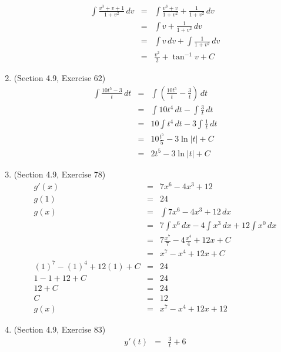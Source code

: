 \documentclass{article}
\begin{document}
\begin{enumerate}
\begin{eqnarray}
            \int{\frac{v^3 + v + 1}{1 + v^2}}\,dv &=& \int{\frac{v^3 + v}{1 + v^2} + \frac{1}{1 + v^2}}\,dv \\
                                                  &=& \int{v + \frac{1}{1 + v^2}}\,dv \\
                                                  &=& \int{v}\,dv + \int{\frac{1}{1 + v^2}}\,dv \\
                                                  &=& \frac{v^2}{2} + \tan^{-1}{v} + C
        \end{eqnarray}
    \item (Section 4.9, Exercise 62)
        \begin{eqnarray}
            \int{\frac{10t^5 - 3}{t}}\,dt &=& \int{\left(\frac{10t^5}{t} - \frac{3}{t}\right)}\,dt \\
                                          &=& \int{10t^4}\,dt - \int{\frac{3}{t}}\,dt \\
                                          &=& 10\int{t^4}\,dt - 3\int{\frac{1}{t}}\,dt \\
                                          &=& 10\frac{t^5}{5} - 3\ln{|t|} + C \\
                                          &=& 2t^5 - 3\ln{|t|} + C
        \end{eqnarray}
    \item (Section 4.9, Exercise 78)
        \begin{eqnarray}
            g'(x) &=& 7x^6 - 4x^3 + 12 \\
            g(1) &=& 24 \\
            g(x) &=& \int{7x^6 - 4x^3 + 12}\,dx \\
                 &=& 7\int{x^6}\,dx - 4\int{x^3}\,dx + 12\int{x^0}\,dx \\
                 &=& 7\frac{x^7}{7} - 4\frac{x^4}{4} + 12x + C \\
                 &=& x^7 - x^4 + 12x + C \\
            (1)^7 - (1)^4 + 12(1) + C &=& 24 \\
            1 - 1 + 12 + C &=& 24 \\
            12 + C &=& 24 \\
            C &=& 12 \\
            g(x) &=& x^7 - x^4 + 12x + 12
        \end{eqnarray}
    \item (Section 4.9, Exercise 83)
        \begin{eqnarray}
            y'(t) &=& \frac{3}{t} + 6 \\

\end{eqnarray}
\end{enumerate}
\end{document}
